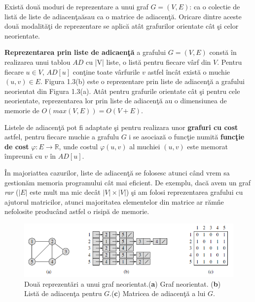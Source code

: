 \documentclass[11pt,a4paper]{report}
\newcommand{\R}{\mathbb{R}}
\begin{document}
   
    Exist\u a dou\u a moduri de reprezentare a unui graf $G=(V,E)$: ca o colectie de list\u a de liste de adiacen\c ta\u asau ca o matrice de adiacen\c t\u a. Oricare dintre aceste dou\u a  modalit\u a\c ti de reprezentare se aplic\u a at\^ at grafurilor orientate c\^ at \c si celor neorientate.
    
    \textbf{Reprezentarea prin liste de adicaen\c t\u a} a grafului $G=(V,E)$ const\u a \^ in realizarea unui tablou $AD$ cu |V| liste, o list\u a pentru fiecare v\^ arf din $V$. Pentru fiecare $u\in V$, $AD[u]$ con\c tine toate v\^ arfurile $v$ astfel \^ inc\^ at exist\u a o muchie $(u,v)\in E$. Figura 1.3(b) este o reprezentare prin liste de adiacen\c t\u a a grafului neorientat din Figura 1.3(a). At\^ at pentru grafurile orientate c\^ at \c si pentru cele neorientate, reprezentarea lor prin liste de adiacen\c t\u a au o dimensiunea de memorie de $O(max(V,E))=O(V+E)$.
    
    Listele de adiacen\c t\u a pot fi adaptate \c si pentru realizara unor \textbf{grafuri cu cost} astfel, pentru fiecare muchie a grafulu $G$ i se asociaz\u a o func\c tie numit\u a \textbf{func\c tie de cost} $\varphi :E\to \R $, unde costul $\varphi(u,v)$ al muchiei $(u,v)$ este memorat \^ impreun\u a cu $v$ \^ in $AD[u]$.
    
    \^ In majoriattea cazurilor, liste de adiacen\c t\u a se folosesc atunci c\^ and vrem sa gestion\u am memoria programului c\^ at mai eficient. De exemplu, dac\u a avem un graf \textit{rar} ($|E|$ este mult ma mic dec\^ at $|V|\times |V|$) \c si am folosi reprezentarea grafului cu ajutorul matricilor, atunci majoritatea elementelor din matrice ar r\u am\^ ne nefolosite produc\^ and astfel o risip\u a de memorie.
    	\begin{figure}[!hbt]
    	\centering
    	\includegraphics[width=13.2cm]{Figura4.png}
    	\caption{Dou\u a reprezent\u ari a unui graf neorientat.(\textbf{a}) Graf  neorientat. \centering \newline(\textbf{b}) List\u a de adiacen\c ta pentru $G$.(\textbf{c}) Matricea de adiacen\c t\u a a lui $G$.}
    \end{figure}
\end{document}
